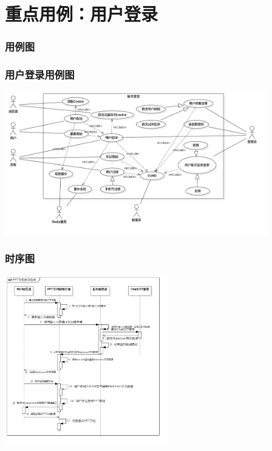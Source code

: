 \section{重点用例：用户登录}
\begin{frame}
    \frametitle{用例图}
    \frametitle{用户登录用例图}
    \center
    \includegraphics[width=4.5in]{contents/figure/login_usecase_diagram.png}
\end{frame}
\begin{frame}
    \frametitle{时序图}
    \center
    \includegraphics[width=2.8in]{contents/figure/ppt_generator_sequence_diagram.png}
\end{frame}